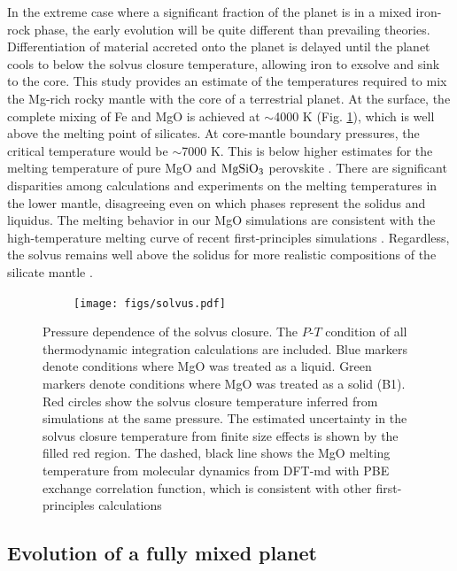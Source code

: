 In the extreme case where a significant fraction of the planet is in a mixed iron-rock
phase, the early evolution will be quite different than prevailing theories.
Differentiation of material accreted onto the planet is delayed until the planet cools to
below the solvus closure temperature, allowing iron to exsolve and sink to the core.
This study provides an estimate of the temperatures required to mix the Mg-rich rocky
mantle with the core of a terrestrial planet. At the surface, the complete mixing of Fe
and MgO is achieved at $\sim$4000 K (Fig. \ref{fig:summary}), which is well above the
melting point of silicates. At core-mantle boundary pressures, the critical temperature
would be $\sim$7000 K.  This is below higher estimates for the melting temperature of
pure MgO \citep{Alfe2005,Belonoshko2010,Boates2013} and $\rm{MgSiO_3}$ perovskite
\citep{Zerr1993}. There are significant disparities among calculations and experiments
on the melting \citep{Belonoshko1994,Belonoshko1997,Alfe2005,Zerr1998}
temperatures in the lower mantle, disagreeing even on which phases represent the solidus
and liquidus. The melting behavior in our MgO simulations are consistent with the
high-temperature melting curve of recent first-principles simulations
\citep{Alfe2005,Belonoshko2010,Boates2013}.  Regardless, the solvus remains well above
the solidus for more realistic compositions of the silicate mantle
\citep{deKoker2013,Zerr1998,Holland1997}.

\begin{figure}[h!]  
  \centering
    \texttt{[image: figs/solvus.pdf]}
\caption{Pressure dependence of the solvus closure. The $P$-$T$ condition of all
  thermodynamic integration calculations are included. Blue markers denote conditions
  where MgO was treated as a liquid. Green markers denote conditions where MgO was
  treated as a solid (B1).  Red circles show the solvus closure temperature inferred from
  simulations at the same pressure. The estimated uncertainty in the solvus closure
  temperature from finite size effects is shown by the filled red region.  The dashed,
  black line shows the MgO melting temperature from molecular dynamics from DFT-md with
  PBE exchange correlation function\citep{Boates2013}, which is consistent with other
  first-principles calculations \citep{Alfe2005,Belonoshko2010}}
\label{fig:summary}
\end{figure}


\subsection{Evolution of a fully mixed planet}

